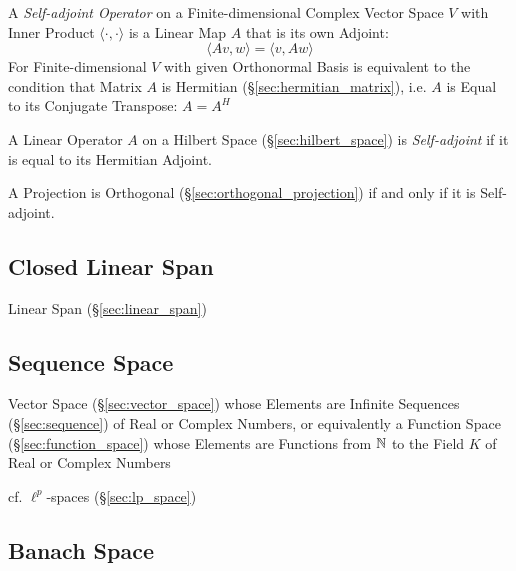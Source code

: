 A \emph{Self-adjoint Operator} on a Finite-dimensional Complex Vector Space $V$
with Inner Product $\langle{\cdot, \cdot}\rangle$ is a Linear Map $A$ that is
its own Adjoint:
\[
  \langle{Av,w}\rangle = \langle{v,Aw}\rangle
\]
For Finite-dimensional $V$ with given Orthonormal Basis is equivalent to the
condition that Matrix $A$ is Hermitian (\S\ref{sec:hermitian_matrix}), i.e. $A$
is Equal to its Conjugate Transpose: $A = A^H$

A Linear Operator $A$ on a Hilbert Space (\S\ref{sec:hilbert_space}) is
\emph{Self-adjoint} if it is equal to its Hermitian Adjoint.

A Projection is Orthogonal (\S\ref{sec:orthogonal_projection}) if and only if
it is Self-adjoint.



\subsection{Closed Linear Span}\label{sec:closed_linear_span}

Linear Span (\S\ref{sec:linear_span})



\subsection{Sequence Space}\label{sec:sequence_space}

Vector Space (\S\ref{sec:vector_space}) whose Elements are Infinite Sequences
(\S\ref{sec:sequence}) of Real or Complex Numbers, or equivalently a Function
Space (\S\ref{sec:function_space}) whose Elements are Functions from $\mathbb{N}$ to
the Field $K$ of Real or Complex Numbers

\fist cf. $\ell^p$-spaces (\S\ref{sec:lp_space})



\subsection{Banach Space}\label{sec:banach_space}

